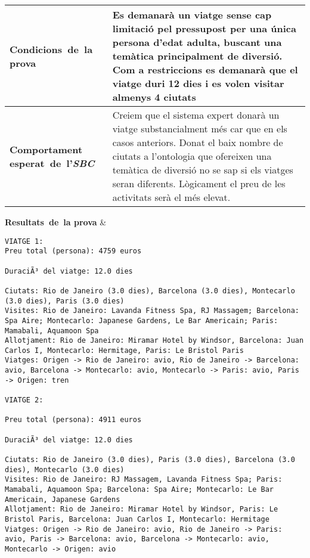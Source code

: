 \documentclass[11pt,a4paper]{article}
\begin{document}
\noindent
\begin{tabular}{|p{}|p{}|}

\hline
\textbf{\mbox{Condicions de la} \mbox{prova}} & Es demanarà un viatge sense cap limitació pel pressupost per una única persona d'edat adulta, buscant una temàtica principalment de diversió. Com a restriccions es demanarà que el viatge duri 12 dies i es volen visitar almenys 4 ciutats\\
\hline
\textbf{Comportament \mbox{esperat de l'\emph{SBC}}} & Creiem que el sistema expert donarà un viatge substancialment més car que en els casos anteriors. Donat el baix nombre de ciutats a l'ontologia que ofereixen una temàtica de diversió no se sap si els viatges seran diferents. Lògicament el preu de les activitats serà el més elevat.\\
\hline
\end{tabular}
\bigskip
\textbf{\mbox{Resultats de la} \mbox{prova}} & 
\begin{lstlisting}
VIATGE 1:
Preu total (persona): 4759 euros

DuraciÃ³ del viatge: 12.0 dies

Ciutats: Rio de Janeiro (3.0 dies), Barcelona (3.0 dies), Montecarlo (3.0 dies), Paris (3.0 dies)
Visites: Rio de Janeiro: Lavanda Fitness Spa, RJ Massagem; Barcelona: Spa Aire; Montecarlo: Japanese Gardens, Le Bar Americain; Paris: Mamabali, Aquamoon Spa
Allotjament: Rio de Janeiro: Miramar Hotel by Windsor, Barcelona: Juan Carlos I, Montecarlo: Hermitage, Paris: Le Bristol Paris
Viatges: Origen -> Rio de Janeiro: avio, Rio de Janeiro -> Barcelona: avio, Barcelona -> Montecarlo: avio, Montecarlo -> Paris: avio, Paris -> Origen: tren

VIATGE 2:

Preu total (persona): 4911 euros

DuraciÃ³ del viatge: 12.0 dies

Ciutats: Rio de Janeiro (3.0 dies), Paris (3.0 dies), Barcelona (3.0 dies), Montecarlo (3.0 dies)
Visites: Rio de Janeiro: RJ Massagem, Lavanda Fitness Spa; Paris: Mamabali, Aquamoon Spa; Barcelona: Spa Aire; Montecarlo: Le Bar Americain, Japanese Gardens
Allotjament: Rio de Janeiro: Miramar Hotel by Windsor, Paris: Le Bristol Paris, Barcelona: Juan Carlos I, Montecarlo: Hermitage
Viatges: Origen -> Rio de Janeiro: avio, Rio de Janeiro -> Paris: avio, Paris -> Barcelona: avio, Barcelona -> Montecarlo: avio, Montecarlo -> Origen: avio


\end{lstlisting} 
\end{document}
